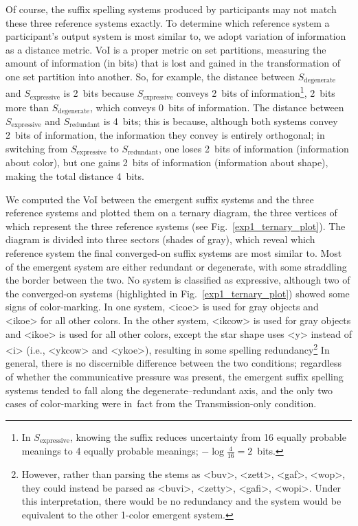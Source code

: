 \documentclass[doc,biblatex]{apa7}
\begin{document}
Of course, the suffix spelling systems produced by participants may not match these three reference systems exactly. To determine which reference system a participant's output system is most similar to, we adopt variation of information \parencite[VoI;][]{Meila:2007} as a distance metric. VoI is a proper metric on set partitions, measuring the amount of information (in bits) that is lost and gained in the transformation of one set partition into another. So, for example, the distance between $S_\mathrm{degenerate}$ and $S_\mathrm{expressive}$ is 2~bits because $S_\mathrm{expressive}$ conveys 2~bits of information\footnote{In $S_\mathrm{expressive}$, knowing the suffix reduces uncertainty from 16 equally probable meanings to 4 equally probable meanings; $-\log\frac{4}{16} = 2$~bits.}, 2~bits more than $S_\mathrm{degenerate}$, which conveys 0~bits of information. The distance between $S_\mathrm{expressive}$ and $S_\mathrm{redundant}$ is 4~bits; this is because, although both systems convey 2~bits of information, the information they convey is entirely orthogonal; in switching from $S_\mathrm{expressive}$ to $S_\mathrm{redundant}$, one loses 2~bits of information (information about color), but one gains 2~bits of information (information about shape), making the total distance 4~bits.

We computed the VoI between the emergent suffix systems and the three reference systems and plotted them on a ternary diagram, the three vertices of which represent the three reference systems (see Fig.~\ref{exp1_ternary_plot}). The diagram is divided into three sectors (shades of gray), which reveal which reference system the final converged-on suffix systems are most similar to. Most of the emergent system are either redundant or degenerate, with some straddling the border between the two. No system is classified as expressive, although two of the converged-on systems (highlighted in Fig.~\ref{exp1_ternary_plot}) showed some signs of color-marking. In one system, <icoe> is used for gray objects and <ikoe> for all other colors. In the other system, <ikcow> is used for gray objects and <ikoe> is used for all other colors, except the star shape uses <y> instead of <i> (i.e., <ykcow> and <ykoe>), resulting in some spelling redundancy\footnote{However, rather than parsing the stems as <buv>, <zett>, <gaf>, <wop>, they could instead be parsed as <buvi>, <zetty>, <gafi>, <wopi>. Under this interpretation, there would be no redundancy and the system would be equivalent to the other 1-color emergent system.} In general, there is no discernible difference between the two conditions; regardless of whether the communicative pressure was present, the emergent suffix spelling systems tended to fall along the degenerate--redundant axis, and the only two cases of color-marking were in~fact from the Transmission-only condition.
\end{document}
